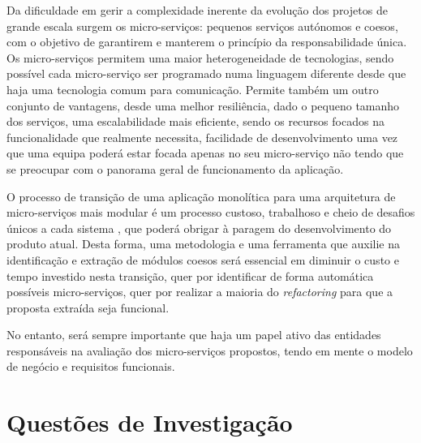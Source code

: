 
    Da dificuldade em gerir a complexidade inerente da evolução dos projetos de grande escala surgem os micro-serviços: pequenos serviços autónomos e coesos, com o objetivo de garantirem e manterem o princípio da responsabilidade única. Os micro-serviços permitem uma maior heterogeneidade de tecnologias, sendo possível cada micro-serviço ser programado numa linguagem diferente desde que haja uma tecnologia comum para comunicação. Permite também um outro conjunto de vantagens, desde uma melhor resiliência, dado o pequeno tamanho dos serviços, uma escalabilidade mais eficiente, sendo os recursos focados na funcionalidade que realmente necessita, facilidade de desenvolvimento uma vez que uma equipa poderá estar focada apenas no seu micro-serviço não tendo que se preocupar com o panorama geral de funcionamento da aplicação.
    

    O processo de transição de uma aplicação monolítica para uma arquitetura de micro-serviços mais modular é um processo custoso, trabalhoso e cheio de desafios únicos a cada sistema \citep{migratinglegacykazanavicius19}, que poderá obrigar à paragem do desenvolvimento do produto atual. Desta forma, uma metodologia e uma ferramenta que auxilie na identificação e extração de módulos coesos será essencial em diminuir o custo e tempo investido nesta transição, quer por identificar de forma automática possíveis micro-serviços, quer por realizar a maioria do \textit{refactoring} para que a proposta extraída seja funcional. 

    No entanto, será sempre importante que haja um papel ativo das entidades responsáveis na avaliação dos micro-serviços propostos, tendo em mente o modelo de negócio e requisitos funcionais.
    

\section{Questões de Investigação}








    
